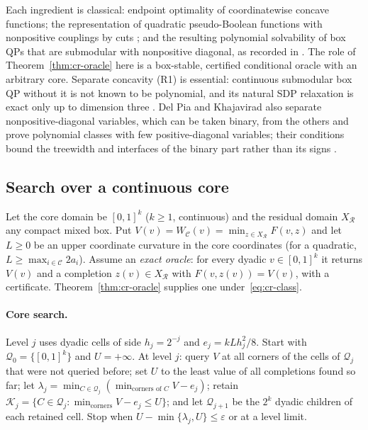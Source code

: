 \begin{remark}\label{rem:cr-cut-prior}
Each ingredient is classical: endpoint optimality of coordinatewise
concave functions; the representation of quadratic pseudo-Boolean
functions with nonpositive couplings by cuts
\cite{Hammer1965,PicardRatliff1975,KolmogorovZabih2004}; and the resulting
polynomial solvability of box QPs that are submodular with nonpositive
diagonal, as recorded in \cite{BurerNatarajanWillemsen2026v3}. The role of
Theorem~\ref{thm:cr-oracle} here is a box-stable, certified conditional
oracle with an arbitrary core. Separate concavity (R1) is essential:
continuous submodular box QP without it is not known to be polynomial,
and its natural SDP relaxation is exact only up to dimension three
\cite{BurerNatarajanWillemsen2026v3}. Del Pia and Khajavirad also separate
nonpositive-diagonal variables, which can be taken binary, from the others
and prove polynomial classes with few positive-diagonal variables; their
conditions bound the treewidth and interfaces of the binary part rather
than its signs \cite{DelPiaKhajavirad2026}.
\end{remark}

\subsection{Search over a continuous core}\label{sec:cr-search}

Let the core domain be $[0,1]^k$ ($k\ge1$, continuous) and the residual
domain $X_{\mathcal R}$ any compact mixed box. Put
$V(v)=W_{\mathcal C}(v)=\min_{z\in X_{\mathcal R}}F(v,z)$ and let $L\ge0$ be an
upper coordinate curvature in the core coordinates (for a quadratic,
$L\ge\max_{i\in\mathcal C}2a_i$). Assume an \emph{exact oracle}: for every
dyadic $v\in[0,1]^k$ it returns $V(v)$ and a completion $z(v)\in X_{\mathcal R}$
with $F(v,z(v))=V(v)$, with a certificate. Theorem~\ref{thm:cr-oracle}
supplies one under~\eqref{eq:cr-class}.

\paragraph{Core search.}
Level $j$ uses dyadic cells of side $h_j=2^{-j}$ and
$e_j=kLh_j^2/8$. Start with $\mathcal Q_0=\{[0,1]^k\}$ and $U=+\infty$.
At level $j$: query $V$ at all corners of the cells of $\mathcal Q_j$ that
were not queried before; set $U$ to the least value of all completions
found so far; let
$\lambda_j=\min_{C\in\mathcal Q_j}(\min_{\text{corners of }C}V-e_j)$;
retain $\mathcal K_j=\{C\in\mathcal Q_j:\min_{\text{corners}}V-e_j\le U\}$;
and let $\mathcal Q_{j+1}$ be the $2^k$ dyadic children of each retained
cell. Stop when $U-\min\{\lambda_j,U\}\le\varepsilon$ or at a level limit.

